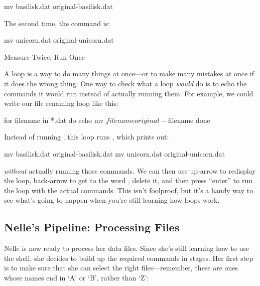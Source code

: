 \begin{VerbIn}
mv basilisk.dat original-basilisk.dat
\end{VerbIn}

\noindent
The second time, the command is:

\begin{VerbIn}
mv unicorn.dat original-unicorn.dat
\end{VerbIn}

\begin{swcbox}{Measure Twice, Run Once}

A loop is a way to do many things at once---or to make many mistakes at
once if it does the wrong thing. One way to check what a loop
\emph{would} do is to echo the commands it would run instead of actually
running them. For example, we could write our file renaming loop like
this:

\begin{VerbIn}
for filename in *.dat
do
    echo mv $filename original-$filename
done
\end{VerbIn}

Instead of running , this loop runs , which
prints out:

\begin{VerbIn}
mv basilisk.dat original-basilisk.dat
mv unicorn.dat original-unicorn.dat
\end{VerbIn}

\noindent
\emph{without} actually running those commands. We can then use up-arrow
to redisplay the loop, back-arrow to get to the word ,
delete it, and then press ``enter'' to run the loop with the actual
 commands. This isn't foolproof, but it's a handy way to see
what's going to happen when you're still learning how loops work.

\end{swcbox}

\subsection*{Nelle's Pipeline: Processing Files}

Nelle is now ready to process her data files. Since she's still learning
how to use the shell, she decides to build up the required commands in
stages. Her first step is to make sure that she can select the right
files---remember, these are ones whose names end in `A' or `B', rather
than `Z':


